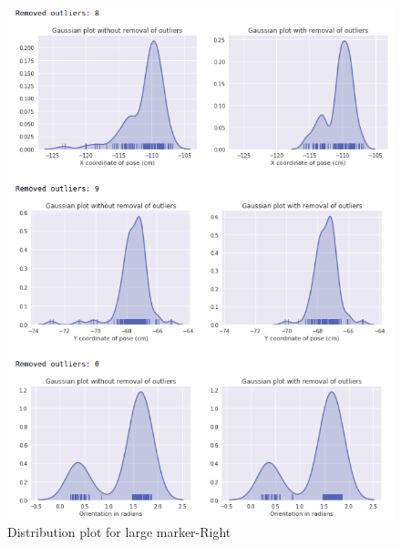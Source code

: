 \documentclass[11pt,a4paper]{article}
\begin{document}
\begin{enumerate}
\begin{figure}[H]
					\includegraphics[scale=0.6]{large-right}
					\caption{Distribution plot for large marker-Right}	
				\end{figure}
				\end{enumerate}
				\newpage
\end{document}

